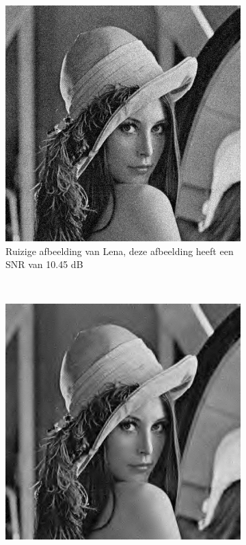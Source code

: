\begin{figure}
    \centering
    \begin{subfigure}[b]{0.4\textwidth}
        \includegraphics[width=\textwidth]{../src/denoising/image/lenaNoise_bior68.png}
        \caption{Ruizige afbeelding van Lena, deze afbeelding heeft een SNR van 10.45 dB \\}
        \label{fig:noise_lena}
    \end{subfigure}
    ~ %
    \begin{subfigure}[b]{0.4\textwidth}
        \includegraphics[width=\textwidth]{../src/denoising/image/lenaDen_bior68.png}

\end{subfigure}
\end{figure}
